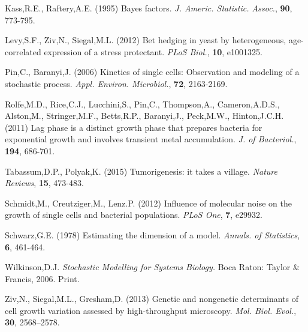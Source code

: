 \documentclass{bioinfo}
\begin{document}
\begin{thebibliography}{}
 Kass,R.E., Raftery,A.E. (1995) Bayes factors. {\it J. Americ. Statistic. Assoc.}, {\bf 90}, 773-795. 

 Levy,S.F., Ziv,N., Siegal,M.L. (2012) Bet hedging in yeast by heterogeneous, age-correlated expression of a stress protectant. {\it PLoS Biol.}, {\bf 10}, e1001325. 

 Pin,C., Baranyi,J. (2006) Kinetics of single cells: Observation and modeling of a stochastic process. {\it Appl. Environ. Microbiol.}, {\bf 72}, 2163-2169. 

 Rolfe,M.D., Rice,C.J., Lucchini,S., Pin,C., Thompson,A., Cameron,A.D.S., Alston,M., Stringer,M.F., Betts,R.P., Baranyi,J., Peck,M.W., Hinton,J.C.H. (2011) Lag phase is a distinct growth phase that prepares bacteria for exponential growth and involves transient metal accumulation. {\it J. of Bacteriol.}, {\bf 194}, 686-701. 

 Tabassum,D.P., Polyak,K. (2015) Tumorigenesis: it takes a village. {\it Nature Reviews}, {\bf 15}, 473-483.

 Schmidt,M., Creutziger,M., Lenz.P. (2012) Influence of molecular noise on the growth of single cells and bacterial populations. {\it PLoS One}, {\bf 7}, e29932. 

 Schwarz,G.E. (1978) Estimating the dimension of a model. {\it Annals. of Statistics}, {\bf 6}, 461-464. 

 Wilkinson,D.J. {\it Stochastic Modelling for Systems Biology.} Boca Raton: Taylor \& Francis, 2006. Print. 

 Ziv,N., Siegal,M.L., Gresham,D. (2013) Genetic and nongenetic determinants of cell growth variation assessed by high-throughput microscopy. {\it Mol. Biol. Evol.}, {\bf 30}, 2568–2578. 

\end{thebibliography}
\end{document}
